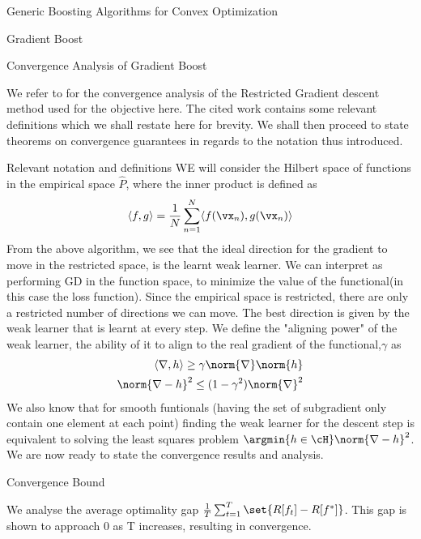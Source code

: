 \documentclass{article}
\begin{document}
\begin{psection}{Generic Boosting Algorithms for Convex Optimization}
\begin{algo}[0.8\textwidth]{Gradient Boost}
	\end{algo}

	\begin{psubsection}{Convergence Analysis of Gradient Boost}

		We refer to \cite{grubb2011generalized} for the convergence analysis of the Restricted Gradient descent method used for the objective here. The cited work contains some relevant definitions which we shall restate here for brevity. We shall then proceed to state theorems on convergence guarantees in regards to the notation thus introduced.

		\begin{pssubsection}{Relevant notation and definitions}
			WE will consider the Hilbert space of functions in the empirical space $\hat{P}$, where the inner product is defined as
			\begin{align*}
				\langle f,g\rangle=\frac{1}{N}\sum_{n=1}^N\langle f(\vx_n),g(\vx_n)\rangle
			\end{align*}
			From the above algorithm, we see that the ideal direction for the gradient to move in the restricted space, is the learnt weak learner. We can interpret as performing GD in the function space, to minimize the value of the functional(in this case the loss function). Since the empirical space is restricted, there are only a restricted number of directions we can move. The best direction is given by the weak learner that is learnt at every step. We define the "aligning power" of the weak learner, the ability of it to align to the real gradient of the functional,$\gamma$ as
			\begin{align*}
				\langle\nabla,h\rangle\geq \gamma\norm{\nabla}\norm{h}\\
				\norm{\nabla-h}^2\leq(1-\gamma^2)\norm{\nabla}^2
			\end{align*}
			We also know that for smooth funtionals (having the set of subgradient only contain one element at each point) finding the weak learner for the descent step is equivalent to solving the least squares problem $\argmin{h \in \cH} \norm{\nabla-h}^2$. We are now ready to state the convergence results and analysis.
		\end{pssubsection}

		\begin{pssubsection}{Convergence Bound}

			We analyse the average optimality gap $\frac{1}{T} \sum_{t = 1}^T \set{R[f_t] - R[f^*]}$. This gap is shown to approach 0 as T increases, resulting in convergence.


\end{pssubsection}
\end{psubsection}
\end{psection}
\end{document}

